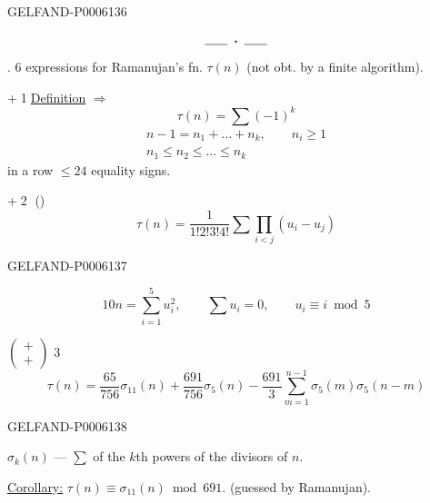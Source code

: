 \begin{GelfandAdjacentEvidence}{GELFAND-P000613}{6}

\[\rule{1.8em}{.4pt}\;\boldsymbol{\cdot}\;\rule{1.8em}{.4pt}\]
. 6 expressions for Ramanujan’s fn. \(\tau(n)\) (not obt. by a finite algorithm).

\textcircled{\scriptsize +}\quad\textcircled{\scriptsize 1}\quad\underline{Definition} \(\Rightarrow\)
\[
\tau(n)=\sum(-1)^k
\]
\[
\begin{gathered}
n-1=n_1+\ldots+n_k,\qquad n_i\ge1\\
n_1\le n_2\le\ldots\le n_k
\end{gathered}
\]
in a row \(\le24\) equality signs.

\textcircled{\scriptsize +}\quad\textcircled{\scriptsize 2}\quad{} ()
\[
\tau(n)=\frac1{1!2!3!4!}\sum\prod_{i<j}(u_i-u_j)
\]
\end{GelfandAdjacentEvidence}
\begin{GelfandAdjacentEvidence}{GELFAND-P000613}{7}

\[
10n=\sum_{i=1}^5u_i^2,\qquad\sum u_i=0,\qquad u_i\equiv i\bmod5
\]

\(\left(\begin{smallmatrix}+\\+\end{smallmatrix}\right)\)
\quad\textcircled{\scriptsize 3}\quad{}
\[
\tau(n)=\frac{65}{756}\sigma_{11}(n)+\frac{691}{756}\sigma_5(n)
-\frac{691}{3}\sum_{m=1}^{n-1}\sigma_5(m)\sigma_5(n-m)
\]
\end{GelfandAdjacentEvidence}
\begin{GelfandAdjacentEvidence}{GELFAND-P000613}{8}

\end{GelfandAdjacentEvidence}

\(\sigma_k(n)\) — \(\sum\) of the \(k\)th powers of the divisors of \(n\).

\underline{Corollary:} \(\tau(n)\equiv\sigma_{11}(n)\bmod691\).
(guessed by Ramanujan).


